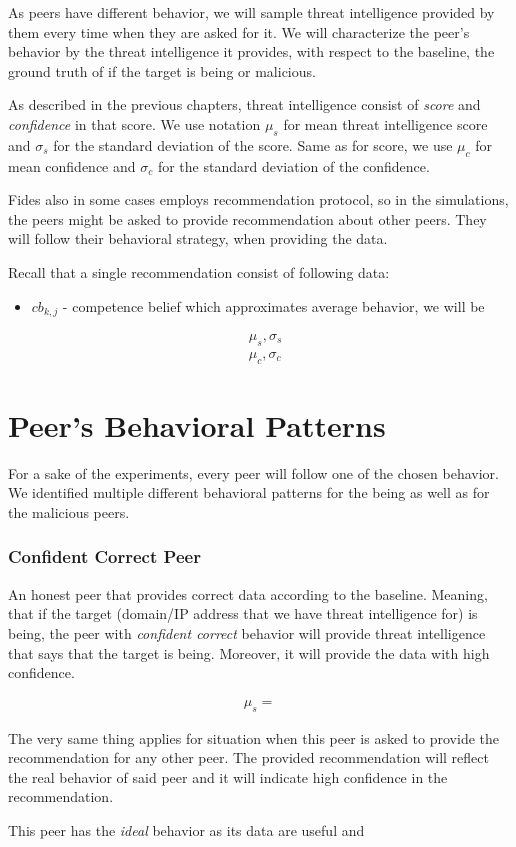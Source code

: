As peers have different behavior, we will sample threat intelligence provided by them every time when they are asked for it.
We will characterize the peer's behavior by the threat intelligence it provides, with respect to the baseline, the ground truth of if the target is being or malicious.

As described in the previous chapters, threat intelligence consist of \textit{score} and \textit{confidence} in that score.
We use notation $\mu_{s}$ for mean threat intelligence score and $\sigma_{s}$ for the standard deviation of the score. 
Same as for score, we use $\mu_{c}$ for mean confidence and $\sigma_{c}$ for the standard deviation of the confidence. 

Fides also in some cases employs recommendation protocol, so in the simulations, the peers might be asked to provide recommendation about other peers.
They will follow their behavioral strategy, when providing the data.

Recall that a single recommendation consist of following data:
\begin{itemize}
    \item $cb_{k,j}$ - competence belief which approximates average behavior, we will be 
\end{itemize}


\begin{equation}
\begin{split}
    &\mu_{s}, \sigma_{s} \\
    &\mu_{c}, \sigma_{c}
\end{split}
\end{equation}

\section{Peer's Behavioral Patterns}
\label{sec:peers-behavioral-patterns}
For a sake of the experiments, every peer will follow one of the chosen behavior. 
We identified multiple different behavioral patterns for the being as well as for the malicious peers.

\subsubsection{Confident Correct Peer}
An honest peer that provides correct data according to the baseline. Meaning, that if the target (domain/IP address that we have threat intelligence for) is being, the peer with \textit{confident correct} behavior will provide threat intelligence that says that the target is being. 
Moreover, it will provide the data with high confidence.

\begin{equation}
\begin{split}
    \mu_{s} = 
\end{split}
\end{equation}

The very same thing applies for situation when this peer is asked to provide the recommendation for any other peer. 
The provided recommendation will reflect the real behavior of said peer and it will indicate high confidence in the recommendation.

This peer has the \textit{ideal} behavior as its data are useful and 